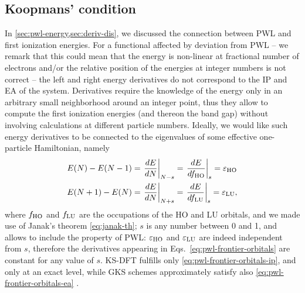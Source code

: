 \subsection{Koopmans' condition\label{sec:koopmans-condition}}
In \cref{sec:pwl-energy,sec:deriv-dis}, we discussed the connection between PWL and first ionization energies. For a functional affected by deviation from PWL -- we remark that this could mean that the energy is non-linear at fractional number of electrons and/or the relative position of the energies at integer numbers is not correct -- the left and right energy derivatives do not correspond to the IP and EA of the system. Derivatives require the knowledge of the energy only in an arbitrary small neighborhood around an integer point, thus they allow to compute the first ionization energies (and thereon the band gap) without involving calculations at different particle numbers. Ideally, we would like such energy derivatives to be connected to the eigenvalues of some effective one-particle Hamiltonian, namely
%
\begin{subequations}
    \begin{align}
        E(N) - E(N-1) &= \left. \frac{dE}{dN} \right|_{N-s} = \left. \frac{dE}{df_{\rm HO}} \right|_{s} = \varepsilon_{\rm HO} \label{eq:pwl-frontier-orbitals-ip}\\
        E(N+1) - E(N) &= \left. \frac{dE}{dN} \right|_{N+s} = \left. \frac{dE}{df_{\rm LU}} \right|_{s} = \varepsilon_{\rm LU} \label{eq:pwl-frontier-orbitals-ea},
    \end{align}
    \label{eq:pwl-frontier-orbitals}
\end{subequations}
%
where $f_{\rm HO}$ and $f_{\rm LU}$ are the occupations of the HO and LU orbitals, and we made use of Janak's theorem \eqref{eq:janak-th}; $s$ is any number between 0 and 1, and allows to include the property of PWL: $\varepsilon_{\rm HO}$ and $\varepsilon_{\rm LU}$ are indeed independent from $s$, therefore the derivatives appearing in Eqs.~\eqref{eq:pwl-frontier-orbitals} are constant for any value of $s$. KS-DFT fulfills only \cref{eq:pwl-frontier-orbitals-ip}, and only at an exact level, while GKS schemes approximately satisfy also \cref{eq:pwl-frontier-orbitals-ea} \cite{seidl_generalized_1996,cohen_fractional-charge_2008,stein_fundamental_2010}.


